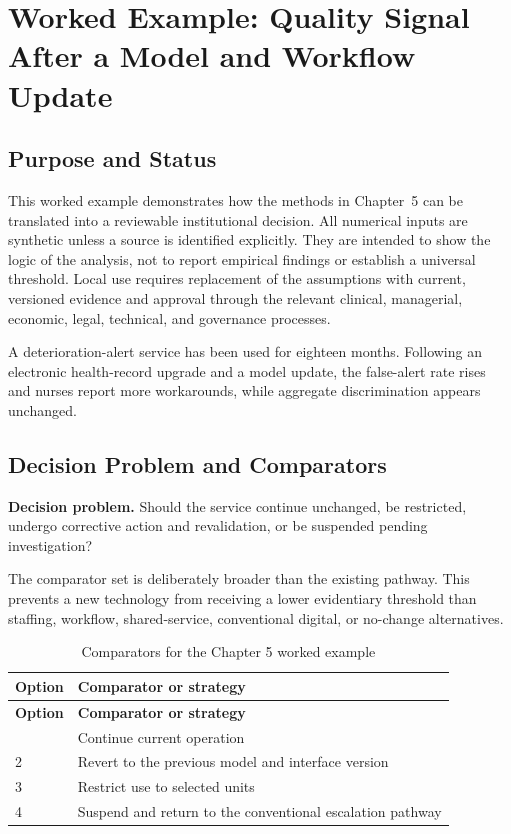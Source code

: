 \section{Worked Example: Quality Signal After a Model and Workflow Update}
\label{sec:comp-ch05-worked-example}

\subsection{Purpose and Status}
This worked example demonstrates how the methods in Chapter~5 can be
translated into a reviewable institutional decision. All numerical inputs are
synthetic unless a source is identified explicitly. They are intended to show the
logic of the analysis, not to report empirical findings or establish a universal
threshold. Local use requires replacement of the assumptions with current,
versioned evidence and approval through the relevant clinical, managerial,
economic, legal, technical, and governance processes.

A deterioration-alert service has been used for eighteen months. Following an electronic health-record upgrade and a model update, the false-alert rate rises and nurses report more workarounds, while aggregate discrimination appears unchanged. 

\subsection{Decision Problem and Comparators}
\textbf{Decision problem.} Should the service continue unchanged, be restricted, undergo corrective action and revalidation, or be suspended pending investigation?

The comparator set is deliberately broader than the existing pathway. This prevents
a new technology from receiving a lower evidentiary threshold than staffing,
workflow, shared-service, conventional digital, or no-change alternatives.

\begin{longtable}{@{}p{}p{}@{}}
\caption{Comparators for the Chapter 5 worked example}
\label{tab:comp-ch05-comparators}\\
\toprule
\textbf{Option} & \textbf{Comparator or strategy} \\
\midrule
\endfirsthead
\toprule
\textbf{Option} & \textbf{Comparator or strategy} \\
\midrule
\endhead
\bottomrule
\endlastfoot
1 & Continue current operation \\
2 & Revert to the previous model and interface version \\
3 & Restrict use to selected units \\
4 & Suspend and return to the conventional escalation pathway \\
\end{longtable}

